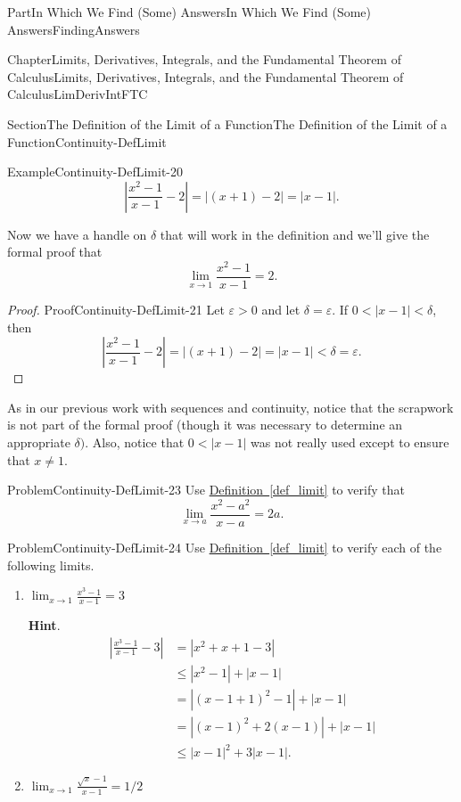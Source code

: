 \documentclass[oneside,10pt,]{book}
\newcommand{\blocktitlefont}{\relax}
\newcommand{\xreffont}{\relax}
\numberwithin{equation}{part}
\newcommand{\abs}[1]{\left|#1\right|}
\def\limit#1#2#3{{\displaystyle\lim_{#1\rightarrow #2}#3}}
\newcommand{\eps}{\varepsilon}
\newcommand{\lt}{<}
\newcommand{\amp}{&}
\begin{document}
\begin{partptx}{Part}{In Which We Find (Some) Answers}{}{In Which We Find (Some) Answers}{}{}{FindingAnswers}
\begin{chapterptx}{Chapter}{Limits, Derivatives, Integrals, and the Fundamental Theorem of Calculus}{}{Limits, Derivatives, Integrals, and the Fundamental Theorem of Calculus}{}{}{LimDerivIntFTC}
\begin{sectionptx}{Section}{The Definition of the Limit of a Function}{}{The Definition of the Limit of a Function}{}{}{Continuity-DefLimit}
\begin{example}{Example}{}{Continuity-DefLimit-20}
\begin{equation*}
\abs{\frac{x^2-1}{x-1}-2}=\abs{(x+1)-2} = \abs{x-1} \text{.}
\end{equation*}
%
\par
Now we have a handle on \(\delta\) that will work in the definition and we'll give the formal proof that%
\begin{equation*}
\limit{x}{1}{\frac{x^2-1}{x-1}}=2 \text{.}
\end{equation*}
%
\end{example}
\begin{proof}{Proof}{}{Continuity-DefLimit-21}
Let \(\eps>0\) and let \(\delta=\eps\).  If \(0\lt
\abs{x-1}\lt \delta\), then%
\begin{equation*}
\abs{\frac{x^2-1}{x-1}-2}=\abs{(x+1)-2}=\abs{x-1}\lt
\delta=\eps \text{.}
\end{equation*}
%
\end{proof}
As in our previous work with sequences and continuity, notice that the scrapwork is not part of the formal proof (though it was necessary to determine an appropriate \(\delta)\).  Also, notice that \(0\lt \abs{x-1}\) was not really used except to ensure that \(x\neq 1\).%
\begin{problem}{Problem}{}{Continuity-DefLimit-23}%
Use \hyperref[def_limit]{Definition~{\xreffont\ref{def_limit}}}  to verify that%
\begin{equation*}
\limit{x}{a}{\frac{x^2-a^2}{x-a}}=2a.{} 
\end{equation*}
%
\end{problem}
\begin{problem}{Problem}{}{Continuity-DefLimit-24}%
Use \hyperref[def_limit]{Definition~{\xreffont\ref{def_limit}}}  to verify each of the following limits.%
\begin{enumerate}[font=\bfseries,label=(\alph*),ref=\alph*]%
\item{}\(\limit{x}{1}{\frac{x^3-1}{x-1}}=3\)%
\par\smallskip%
\noindent\textbf{\blocktitlefont Hint}.\hypertarget{Continuity-DefLimit-24-3-2}{}\quad{}%
\begin{align*}
\abs{\frac{x^3-1}{x-1}-3} \amp =
\abs{x^2+x+1-3} \\
\amp \leq\abs{x^2-1}+\abs{x-1}\\
\amp =\abs{(x-1+1)^2-1}+\abs{x-1} \\
\amp =\abs{(x-1)^2+2(x-1)}+\abs{x-1} \\
\amp
\leq\abs{x-1}^2 + 3\abs{x-1} \text{.}
\end{align*}
%
\item{}\(\limit{x}{1}{\frac{\sqrt{x}-1}{x-1}}=1/2\)%

\end{enumerate}
\end{problem}
\end{sectionptx}
\end{chapterptx}
\end{partptx}
\end{document}
